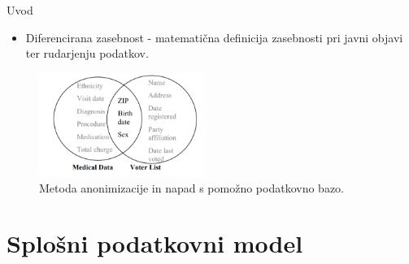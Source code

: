 \documentclass{beamer}
\begin{document}
\begin{frame}{Uvod}

  \begin{itemize}
  \item Diferencirana zasebnost - matematična definicija zasebnosti pri javni objavi ter rudarjenju podatkov.
 \end{itemize}
 
\begin{figure}
\includegraphics[width=5.4cm]{slika1} 
\caption{Metoda anonimizacije in napad s pomožno podatkovno bazo.}
\end{figure}

%
\end{frame}


\section{Splošni podatkovni model}
\end{document}
